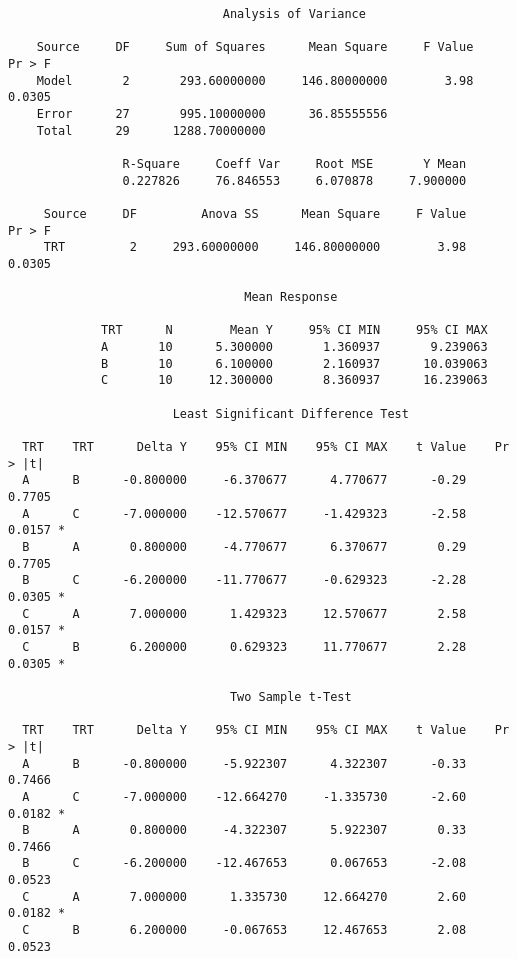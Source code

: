 \documentclass[12pt]{article}
\begin{document}
{\scriptsize\begin{verbatim}
                              Analysis of Variance

    Source     DF     Sum of Squares      Mean Square     F Value     Pr > F
    Model       2       293.60000000     146.80000000        3.98     0.0305
    Error      27       995.10000000      36.85555556                       
    Total      29      1288.70000000                                        

                R-Square     Coeff Var     Root MSE       Y Mean
                0.227826     76.846553     6.070878     7.900000

     Source     DF         Anova SS      Mean Square     F Value     Pr > F
     TRT         2     293.60000000     146.80000000        3.98     0.0305

                                 Mean Response

             TRT      N        Mean Y     95% CI MIN     95% CI MAX
             A       10      5.300000       1.360937       9.239063
             B       10      6.100000       2.160937      10.039063
             C       10     12.300000       8.360937      16.239063

                       Least Significant Difference Test

  TRT    TRT      Delta Y    95% CI MIN    95% CI MAX    t Value    Pr > |t|  
  A      B      -0.800000     -6.370677      4.770677      -0.29      0.7705  
  A      C      -7.000000    -12.570677     -1.429323      -2.58      0.0157 *
  B      A       0.800000     -4.770677      6.370677       0.29      0.7705  
  B      C      -6.200000    -11.770677     -0.629323      -2.28      0.0305 *
  C      A       7.000000      1.429323     12.570677       2.58      0.0157 *
  C      B       6.200000      0.629323     11.770677       2.28      0.0305 *

                               Two Sample t-Test

  TRT    TRT      Delta Y    95% CI MIN    95% CI MAX    t Value    Pr > |t|  
  A      B      -0.800000     -5.922307      4.322307      -0.33      0.7466  
  A      C      -7.000000    -12.664270     -1.335730      -2.60      0.0182 *
  B      A       0.800000     -4.322307      5.922307       0.33      0.7466  
  B      C      -6.200000    -12.467653      0.067653      -2.08      0.0523  
  C      A       7.000000      1.335730     12.664270       2.60      0.0182 *
  C      B       6.200000     -0.067653     12.467653       2.08      0.0523  
\end{verbatim}}
\end{document}
